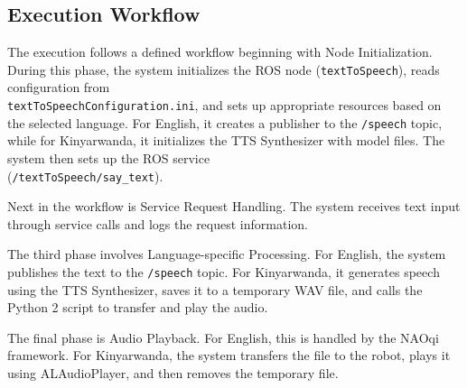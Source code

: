 \documentclass{CSSRforAfrica}
\begin{document}




\newpage

\subsection{Execution Workflow}

The execution follows a defined workflow beginning with Node Initialization. During this phase, the system initializes the ROS node (\texttt{textToSpeech}), reads configuration from \\ \texttt{textToSpeechConfiguration.ini}, and sets up appropriate resources based on the selected language. For English, it creates a publisher to the \texttt{/speech} topic, while for Kinyarwanda, it initializes the TTS Synthesizer with model files. The system then sets up the ROS service \\ (\texttt{/textToSpeech/say\_text}).

Next in the workflow is Service Request Handling. The system receives text input through service calls and logs the request information.

The third phase involves Language-specific Processing. For English, the system publishes the text to the \texttt{/speech} topic. For Kinyarwanda, it generates speech using the TTS Synthesizer, saves it to a temporary WAV file, and calls the Python 2 script to transfer and play the audio.

The final phase is Audio Playback. For English, this is handled by the NAOqi framework. For Kinyarwanda, the system transfers the file to the robot, plays it using ALAudioPlayer, and then removes the temporary file.
\end{document}
